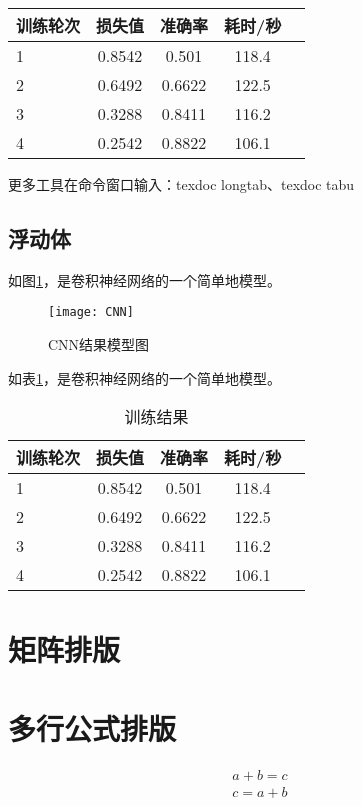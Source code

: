 \documentclass[12pt]{article} %
\begin{document}
	\begin{tabular}{|l||c|c|c|r}
		\hline
		训练轮次 & 损失值 & 准确率 & 耗时/秒 \\
		\hline\hline
		1 & 0.8542 & 0.501 & 118.4  \\
		2 & 0.6492 & 0.6622 & 122.5 \\
		3 & 0.3288 & 0.8411 & 116.2 \\
		4 & 0.2542 & 0.8822 & 106.1 \\
		\hline
	\end{tabular}
	
	更多工具在命令窗口输入：texdoc longtab、texdoc tabu
	
	\subsection{浮动体}
	
	如图\ref{fig-CNN}，是卷积神经网络的一个简单地模型。
	\begin{figure}[htbp]
		\centering
		\texttt{[image: CNN]}
		\caption{CNN结果模型图}
		\label{fig-CNN}     %
	\end{figure}
	
	如表\ref{tab-result}，是卷积神经网络的一个简单地模型。
	\begin{table}
		\centering
		\caption{训练结果}
		\label{tab-result}
		\begin{tabular}{|l||c|c|c|r}
			\hline
			训练轮次 & 损失值 & 准确率 & 耗时/秒 \\
			\hline\hline
			1 & 0.8542 & 0.501 & 118.4  \\
			2 & 0.6492 & 0.6622 & 122.5 \\
			3 & 0.3288 & 0.8411 & 116.2 \\
			4 & 0.2542 & 0.8822 & 106.1 \\
			\hline
		\end{tabular}
	\end{table}
	
	\section{矩阵排版}
	\section{多行公式排版}
	
	\begin{gather}
		a + b = c \\ 
		c = a + b
	\end{gather}
	
\end{document}
